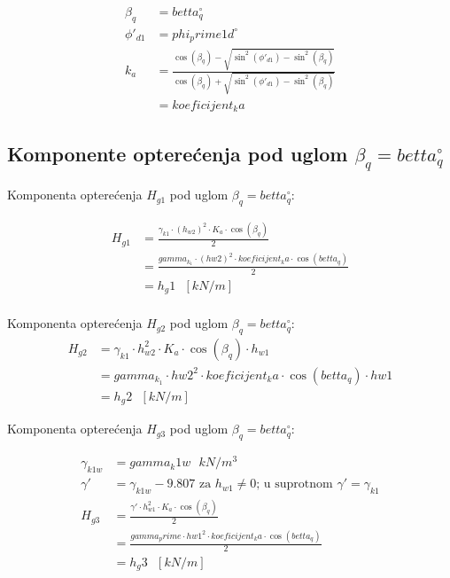 \documentclass[a4paper, 11pt]{article}
\begin{document}
\begin{align*}
\beta_{q} &= betta_q ^\circ \\
\phi'_{d1} &= phi_prime1d ^\circ  \\
k_a &= \frac{\cos(\beta_q) - \sqrt{\sin^2(\phi'_{d1}) - \sin^2(\beta_q)}}{\cos(\beta_q) + \sqrt{\sin^2(\phi'_{d1}) - \sin^2(\beta_q)}} \\
	&= koeficijent_ka
\end{align*}

\subsection*{Komponente optere\'cenja pod uglom $\beta_{q} = betta_q ^ \circ$}

Komponenta optere\'cenja $H_{g1}$ pod uglom $\beta_{q} = betta_q ^ \circ$:

\begin{align*}
H_{g1} &= \frac{\gamma_{k1} \cdot \left(h_{w2} \right)^2 \cdot K_{a} \cdot \cos(\beta_q)}{2}\\
	   &=  \frac{gamma_k_1 \cdot \left(hw2 \right)^2 \cdot koeficijent_ka \cdot \cos(betta_q)}{2} \\
	   &= h_g1 \text{ } [kN/m] \\
\end{align*}

Komponenta optere\'cenja $H_{g2}$ pod uglom $\beta_{q} = betta_q ^ \circ$:
\begin{align*}
H_{g2} &= \gamma_{k1} \cdot h_{w2}^2 \cdot K_{a} \cdot \cos(\beta_{q}) \cdot h_{w1} \\
	   &= gamma_k_1 \cdot hw2^2 \cdot koeficijent_ka \cdot \cos (betta_q) \cdot hw1 \\
	   &= h_g2 \text{ } [kN/m]
\end{align*}

Komponenta optere\'cenja $H_{g3}$ pod uglom $\beta_{q} = betta_q ^ \circ$:

\begin{align*}
\gamma_{k1w} &= gamma_k1w \text{ } kN/m^3 \\
\gamma' &= \gamma_{k1w} - 9.807 \text{ za } h_{w1} \neq 0 \text{; u suprotnom } \gamma' = \gamma_{k1} \\
H_{g3}  &= \frac{\gamma' \cdot h_{w1} ^2 \cdot K_{a} \cdot \cos( \beta_{q})}{2} \\
		&= \frac{gamma_prime \cdot hw1 ^2 \cdot koeficijent_ka \cdot \cos(betta_q)}{2} \\
		&= h_g3 \text{ } [kN/m]
\end{align*}
\end{document}
